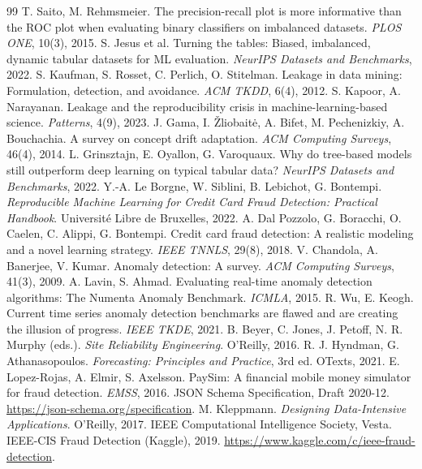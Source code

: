 \documentclass[11pt,a4paper]{article}
\theoremstyle{definition}
\theoremstyle{remark}
\numberwithin{equation}{section}
\begin{document}
\begin{thebibliography}{99}\small
{} T. Saito, M. Rehmsmeier. The precision-recall plot is more informative than the ROC plot when evaluating binary classifiers on imbalanced datasets. \emph{PLOS ONE}, 10(3), 2015.
 S. Jesus et al. Turning the tables: Biased, imbalanced, dynamic tabular datasets for ML evaluation. \emph{NeurIPS Datasets and Benchmarks}, 2022.
 S. Kaufman, S. Rosset, C. Perlich, O. Stitelman. Leakage in data mining: Formulation, detection, and avoidance. \emph{ACM TKDD}, 6(4), 2012.
 S. Kapoor, A. Narayanan. Leakage and the reproducibility crisis in machine-learning-based science. \emph{Patterns}, 4(9), 2023.
 J. Gama, I. Žliobaitė, A. Bifet, M. Pechenizkiy, A. Bouchachia. A survey on concept drift adaptation. \emph{ACM Computing Surveys}, 46(4), 2014.
 L. Grinsztajn, E. Oyallon, G. Varoquaux. Why do tree-based models still outperform deep learning on typical tabular data? \emph{NeurIPS Datasets and Benchmarks}, 2022.
 Y.-A. Le Borgne, W. Siblini, B. Lebichot, G. Bontempi. \emph{Reproducible Machine Learning for Credit Card Fraud Detection: Practical Handbook}. Université Libre de Bruxelles, 2022.
 A. Dal Pozzolo, G. Boracchi, O. Caelen, C. Alippi, G. Bontempi. Credit card fraud detection: A realistic modeling and a novel learning strategy. \emph{IEEE TNNLS}, 29(8), 2018.
 V. Chandola, A. Banerjee, V. Kumar. Anomaly detection: A survey. \emph{ACM Computing Surveys}, 41(3), 2009.
 A. Lavin, S. Ahmad. Evaluating real-time anomaly detection algorithms: The Numenta Anomaly Benchmark. \emph{ICMLA}, 2015.
 R. Wu, E. Keogh. Current time series anomaly detection benchmarks are flawed and are creating the illusion of progress. \emph{IEEE TKDE}, 2021.
 B. Beyer, C. Jones, J. Petoff, N. R. Murphy (eds.). \emph{Site Reliability Engineering}. O'Reilly, 2016.
 R. J. Hyndman, G. Athanasopoulos. \emph{Forecasting: Principles and Practice}, 3rd ed. OTexts, 2021.
 E. Lopez-Rojas, A. Elmir, S. Axelsson. PaySim: A financial mobile money simulator for fraud detection. \emph{EMSS}, 2016.
 JSON Schema Specification, Draft 2020-12. \url{https://json-schema.org/specification}.
 M. Kleppmann. \emph{Designing Data-Intensive Applications}. O'Reilly, 2017.
 IEEE Computational Intelligence Society, Vesta. IEEE-CIS Fraud Detection (Kaggle), 2019. \url{https://www.kaggle.com/c/ieee-fraud-detection}.
\end{thebibliography}
\end{document}
